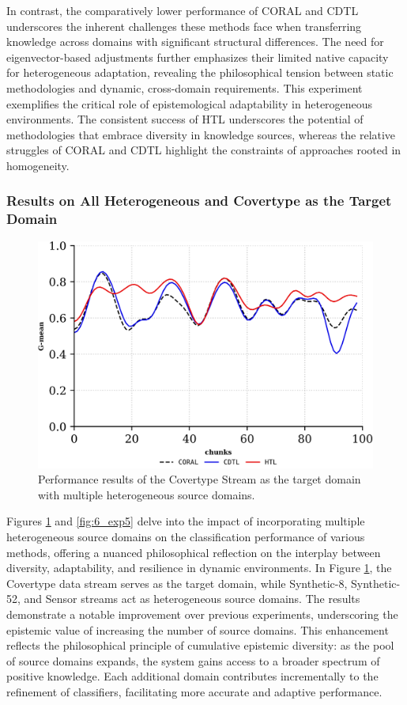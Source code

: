 In contrast, the comparatively lower performance of CORAL and CDTL underscores the inherent challenges these methods face when transferring knowledge across domains with significant structural differences. The need for eigenvector-based adjustments further emphasizes their limited native capacity for heterogeneous adaptation, revealing the philosophical tension between static methodologies and dynamic, cross-domain requirements. This experiment exemplifies the critical role of epistemological adaptability in heterogeneous environments. The consistent success of HTL underscores the potential of methodologies that embrace diversity in knowledge sources, whereas the relative struggles of CORAL and CDTL highlight the constraints of approaches rooted in homogeneity.

\subsubsection{Results on All Heterogeneous and Covertype as the Target Domain}
\begin{figure}[H]
	\centering
	\includegraphics[width=0.6\linewidth]{6_transfer_learning/figures/exp2_1.png}
  \caption{Performance results of the Covertype Stream as the target domain with multiple heterogeneous source domains.}
	\label{fig:6_exp4}
\end{figure}
Figures \ref{fig:6_exp4} and \ref{fig:6_exp5} delve into the impact of incorporating multiple heterogeneous source domains on the classification performance of various methods, offering a nuanced philosophical reflection on the interplay between diversity, adaptability, and resilience in dynamic environments. In Figure \ref{fig:6_exp4}, the Covertype data stream serves as the target domain, while Synthetic-8, Synthetic-52, and Sensor streams act as heterogeneous source domains. The results demonstrate a notable improvement over previous experiments, underscoring the epistemic value of increasing the number of source domains. This enhancement reflects the philosophical principle of cumulative epistemic diversity: as the pool of source domains expands, the system gains access to a broader spectrum of positive knowledge. Each additional domain contributes incrementally to the refinement of classifiers, facilitating more accurate and adaptive performance.

